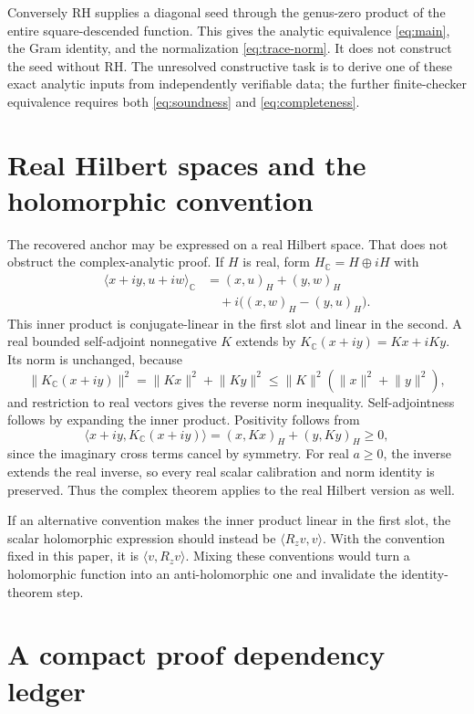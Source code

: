 \documentclass[11pt,a4paper]{article}
\numberwithin{equation}{section}
\theoremstyle{definition}
\theoremstyle{remark}
\newcommand{\C}{\mathbb C}
\newcommand{\ip}[2]{\langle #1,#2\rangle}
\newcommand{\norm}[1]{\lVert #1\rVert}
\begin{document}
Conversely RH supplies a diagonal seed through the genus-zero
product of the entire square-descended function. This gives the
analytic equivalence \eqref{eq:main}, the Gram identity, and the
normalization \eqref{eq:trace-norm}. It does not construct the seed
without RH. The unresolved constructive task is to derive one of
these exact analytic inputs from independently verifiable data;
the further finite-checker equivalence requires both
\eqref{eq:soundness} and \eqref{eq:completeness}.

\appendix
\section[Real Hilbert spaces]{Real Hilbert spaces and the holomorphic convention}\label{app:real}

The recovered anchor may be expressed on a real Hilbert space.
That does not obstruct the complex-analytic proof. If $H$ is real,
form $H_\C=H\oplus iH$ with
\begin{align*}
\ip{x+iy}{u+iw}_{\C}
&=(x,u)_H+(y,w)_H\\
&\quad+i\bigl((x,w)_H-(y,u)_H\bigr).
\end{align*}
This inner product is conjugate-linear in the first slot and linear
in the second. A real bounded self-adjoint nonnegative $K$ extends
by $K_\C(x+iy)=Kx+iKy$. Its norm is unchanged, because
\[
\norm{K_\C(x+iy)}^2=\norm{Kx}^2+\norm{Ky}^2
\leq\norm K^2(\norm x^2+\norm y^2),
\]
and restriction to real vectors gives the reverse norm inequality.
Self-adjointness follows by expanding the inner product. Positivity
follows from
\[
\ip{x+iy}{K_\C(x+iy)}=(x,Kx)_H+(y,Ky)_H\geq0,
\]
since the imaginary cross terms cancel by symmetry.
For real $a\geq0$, the inverse extends the real inverse, so every
real scalar calibration and norm identity is preserved. Thus the
complex theorem applies to the real Hilbert version as well.

If an alternative convention makes the inner product linear in the
first slot, the scalar holomorphic expression should instead be
$\ip{R_zv}{v}$. With the convention fixed in this paper, it is
$\ip v{R_zv}$. Mixing these conventions would turn a holomorphic
function into an anti-holomorphic one and invalidate the identity-theorem
step.

\section[Proof dependencies]{A compact proof dependency ledger}\label{app:ledger}
\end{document}

